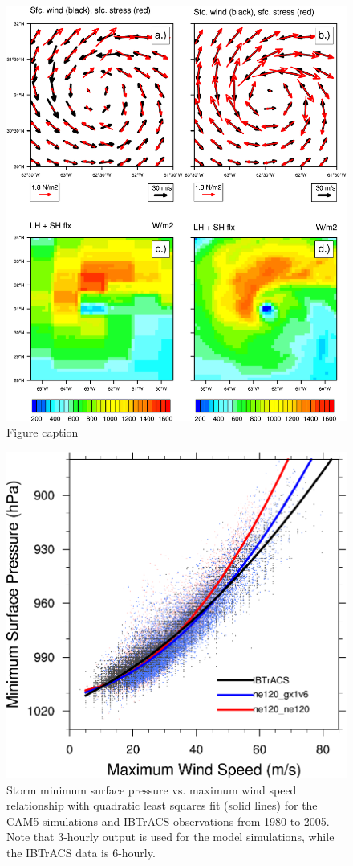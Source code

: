 \documentclass[draft,ms]{AGUTeX}
\begin{document}
\begin{figure}
\includegraphics[width=0.8\linewidth]{fig_compareStress.pdf}
\caption{Figure caption}
\label{fig:forecast_panels}
\end{figure}

\begin{figure}
\includegraphics[width=0.8\linewidth]{fig_preswind.pdf}
\caption{Storm minimum surface pressure vs. maximum wind speed relationship with quadratic least squares fit (solid lines) for the CAM5 simulations and IBTrACS observations from 1980 to 2005.  Note that 3-hourly output is used for the model simulations, while the IBTrACS data is 6-hourly.}
\label{fig:preswind}
\end{figure}
\end{document}

